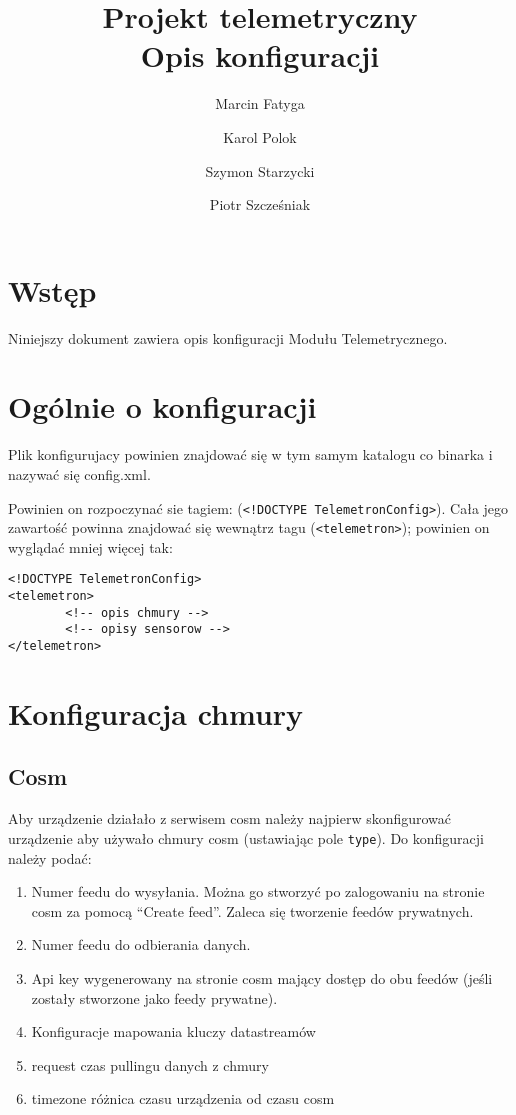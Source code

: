 \documentclass[11pt]{article}
\title{Projekt telemetryczny \\ Opis konfiguracji}
\author{Marcin Fatyga \and Karol Polok \and Szymon Starzycki \and Piotr Szcześniak}
\begin{document}
\begin{titlepage}

\maketitle

\thispagestyle{empty}
\end{titlepage}

\tableofcontents

\newpage

\section{Wstęp}
Niniejszy dokument zawiera opis konfiguracji Modułu Telemetrycznego.

\section{Ogólnie o konfiguracji}
Plik konfigurujacy powinien znajdować się w tym samym katalogu co binarka i nazywać się config.xml.

Powinien on rozpoczynać sie tagiem: (\verb|<!DOCTYPE TelemetronConfig>|). Cała jego zawartość powinna znajdować się wewnątrz tagu (\verb|<telemetron>|); powinien on wyglądać mniej więcej tak:
\begin{verbatim}
<!DOCTYPE TelemetronConfig>
<telemetron>
        <!-- opis chmury -->
        <!-- opisy sensorow -->
</telemetron>
\end{verbatim}


\section{Konfiguracja chmury}

\subsection{Cosm}

Aby urządzenie działało z serwisem cosm należy najpierw skonfigurować urządzenie aby używało chmury cosm (ustawiając pole \verb|type|).
Do konfiguracji należy podać:
\begin{enumerate}
\item Numer feedu do wysyłania. Można go stworzyć po zalogowaniu na stronie cosm za pomocą “Create feed”. Zaleca się tworzenie feedów prywatnych.
\item Numer feedu do odbierania danych.
\item Api key wygenerowany na stronie cosm mający dostęp do obu feedów (jeśli zostały stworzone jako feedy prywatne).
\item Konfiguracje mapowania kluczy datastreamów
\item request czas pullingu danych z chmury
\item timezone różnica czasu urządzenia od czasu cosm

\end{enumerate}
\end{document}
